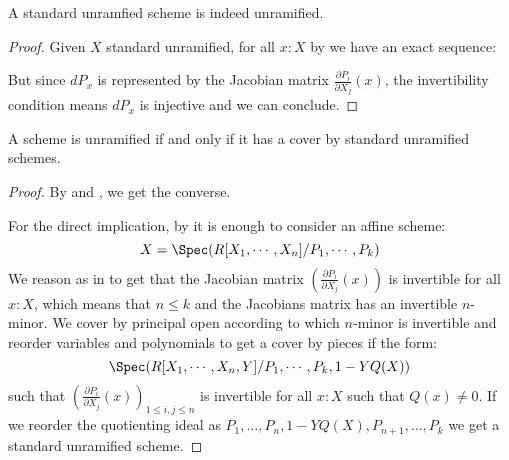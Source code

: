 
\begin{lemma}\label{standard-unramified-is-unramified}
A standard unramfied scheme is indeed unramified.
\end{lemma}

\begin{proof}
Given $X$ standard unramified, for all $x:X$ by  we have an exact sequence:
  \begin{center}
  \end{center}
  But since $dP_x$ is represented by the Jacobian matrix $\frac{\partial P_i}{\partial X_j}(x)$, the invertibility condition means $dP_x$ is injective and we can conclude.
\end{proof}

\begin{proposition}
  \label{unramified-iff-locally-std-unramified}
A scheme is unramified if and only if it has a cover by standard unramified schemes.
\end{proposition}

\begin{proof}
By  and , we get the converse.

  For the direct implication, by  it is enough to consider an affine scheme: \[X=\Spec(R[X_1,\cdots,X_n]/P_1,\cdots,P_k)\]
 We reason as in  to get that the Jacobian matrix $\left(\frac{\partial P_i}{\partial X_j}(x)\right)$ is invertible for all $x:X$, which means that $n\leq k$ and the Jacobians matrix has an invertible $n$-minor. We cover by principal open according to which $n$-minor is invertible and reorder variables and polynomials to get a cover by pieces if the form:
 \[\Spec(R[X_1,\cdots,X_n,Y]/P_1,\cdots,P_k,1-YQ(X))\]
 such that $\left(\frac{\partial P_i}{\partial X_j}(x)\right)_{1\leq i,j\leq n}$ is invertible for all $x:X$ such that $Q(x)\not=0$. If we reorder the quotienting ideal as $P_1,\hdots,P_n,1-YQ(X),P_{n+1},\hdots,P_k$ we get a standard unramified scheme.
\end{proof}


